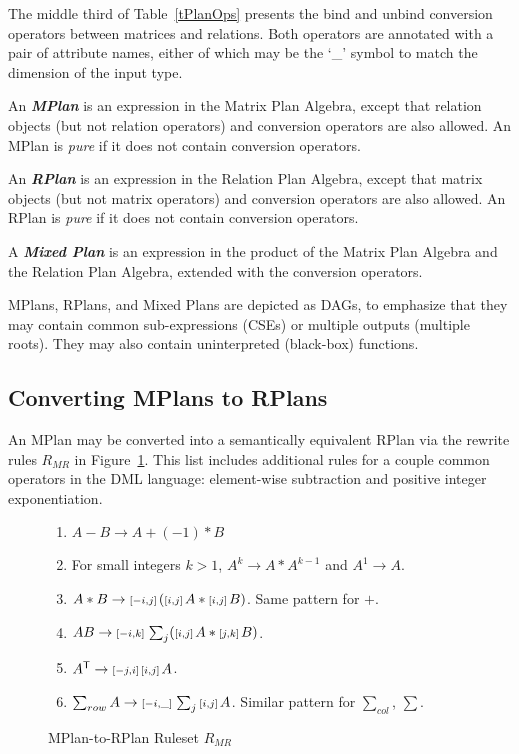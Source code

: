 The middle third of Table~\ref{tPlanOps} presents the bind and unbind conversion operators between matrices and relations. Both operators are annotated with a pair of attribute names, either of which may be the `\_' symbol to match the dimension of the input type. %

\begin{definition}
An \textbf{\emph{MPlan}} is an expression in the Matrix Plan Algebra, except that relation objects (but not relation operators) and conversion operators are also allowed. An MPlan is \emph{pure} if it does not contain conversion operators.

An \textbf{\emph{RPlan}} is an expression in the Relation Plan Algebra, except that matrix objects (but not matrix operators) and conversion operators are also allowed. An RPlan is \emph{pure} if it does not contain conversion operators.

A \textbf{\emph{Mixed Plan}} is an expression in the product of the Matrix Plan Algebra and the Relation Plan Algebra, extended with the conversion operators.
\end{definition}

MPlans, RPlans, and Mixed Plans are depicted as DAGs, to emphasize that they may contain common sub-expressions (CSEs) or multiple outputs (multiple roots).
They may also contain uninterpreted (black-box) functions.



\subsection{Converting MPlans to RPlans}
An MPlan may be converted into a semantically equivalent RPlan via the rewrite rules $R_{MR}$ in Figure~\ref{RMR}.
This list includes additional rules for a couple common operators in the DML language: element-wise subtraction and positive integer exponentiation.

\begin{figure}[htb]
\begin{enumerate}
  \item $A - B \rightarrow A + (-1) * B$
  \item For small integers $k > 1$, $A^k \rightarrow A * A^{k-1}$ and $A^1 \to A$.
  \item $A*B \rightarrow {\ensuremath{\scriptstyle\left[-i,j\right]\,}}({\scriptstyle\left[i,j\right]\,}A * {\scriptstyle\left[i,j\right]\,}B)$.  Same pattern for $+$.
  \item $AB \rightarrow {\ensuremath{\scriptstyle\left[-i,k\right]\,}} \sum_j ({\scriptstyle\left[i,j\right]\,}A * {\scriptstyle\left[j,k\right]\,}B)$. 
  \item $A^{\mathsf{T}} \rightarrow {\ensuremath{\scriptstyle\left[-j,i\right]\,}} {\ensuremath{\scriptstyle\left[i,j\right]\,}}A$.
  \item $\sum_{row} A \rightarrow {\ensuremath{\scriptstyle\left[-i,\_\right]\,}} \sum_j {\scriptstyle\left[i,j\right]\,} A$.  Similar pattern for $\sum_{col}$, $\sum$.
\end{enumerate}
\caption{MPlan-to-RPlan Ruleset $R_{MR}$}
\label{RMR}
\end{figure}

